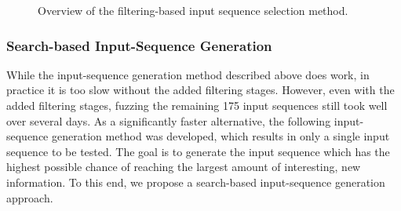 \begin{figure}
\begin{centering}
\caption{Overview of the filtering-based input sequence selection method.}
\label{fig:fuzz_filtering}
\end{centering}
\end{figure}

\subsubsection{Search-based Input-Sequence Generation} \label{subsubsec:search}
While the input-sequence generation method described above does work, in practice it is too slow without the added filtering stages. However, even with the added filtering stages, fuzzing the remaining 175 input sequences still took well over several days. As a significantly faster alternative, the following input-sequence generation method was developed, which results in only a single input sequence to be tested. The goal is to generate the input sequence which has the highest possible chance of reaching the largest amount of interesting, new information. To this end, we propose a search-based input-sequence generation approach. 

